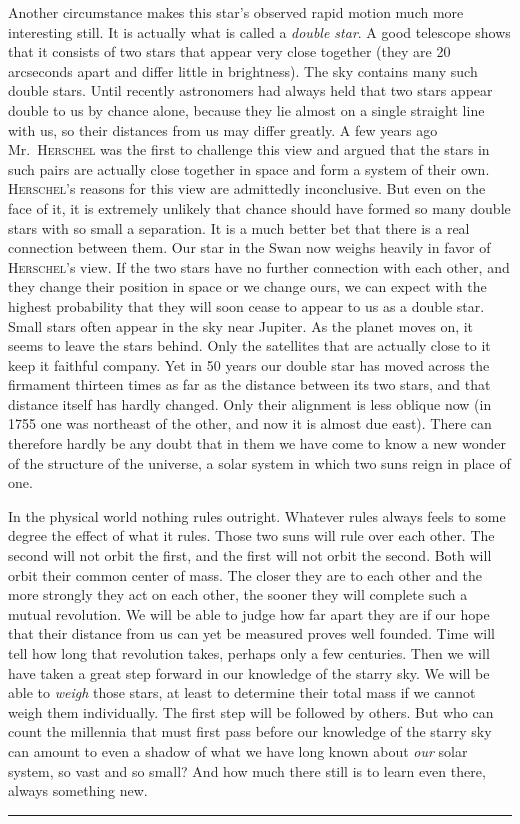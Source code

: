 Another circumstance makes this star’s observed rapid motion much more interesting still. It is actually what is called a \emph{double star}. A good telescope shows that it consists of two stars that appear very close together (they are 20 arcseconds apart and differ little in brightness). The sky contains many such double stars. Until recently astronomers had always held that two stars appear double to us by chance alone, because they lie almost on a single straight line with us, so their distances from us may differ greatly. A few years ago Mr.\ \textsc{Herschel} was the first to challenge this view and argued that the stars in such pairs are actually close together in space and form a system of their own. \textsc{Herschel}’s reasons for this view are admittedly inconclusive. But even on the face of it, it is extremely unlikely
%
that chance should have formed so many double stars with so small a separation. It is a much better bet that there is a real connection between them. Our star in the Swan now weighs heavily in favor of \textsc{Herschel}’s view. If the two stars have no further connection with each other, and they change their position in space or we change ours, we can expect with the highest probability that they will soon cease to appear to us as a double star. Small stars often appear in the sky near Jupiter. As the planet moves on, it seems to leave the stars behind. Only the satellites that are actually close to it keep it faithful company. Yet in 50 years our double star has moved across the firmament thirteen times as far as the distance between its two stars, and that distance itself has hardly changed. Only their alignment is less oblique now (in 1755 one was northeast of the other, and now it is almost due east). There can therefore hardly be any doubt that in them we have come to know a new wonder of the structure of the universe, a solar system in which two suns reign in place of one.

In the physical world nothing rules outright. Whatever rules always feels to some degree the effect of what it rules. Those two suns will rule over each other. The second will not orbit the first, and the first will not orbit the second. Both will orbit their common center of mass. The closer they are to each other and the more strongly they act on each other, the sooner they will complete such a mutual revolution. We will be able to judge how far apart they are if our hope that their distance from us can yet be measured proves well founded. Time will tell how long that revolution takes, perhaps only a few centuries. Then we will have taken a great step forward in our knowledge of the starry sky. We will be able to \emph{weigh} those stars, at least to determine their total mass if we cannot weigh them individually. The first step will be followed by others. But who can count the millennia that must first pass before our knowledge of the starry sky can amount to even a shadow of what we have long known about \emph{our} solar system, so vast and so small? And how much there still is to learn even there, always something new.
\begin{center}\rule{0.24\linewidth}{0.4pt}\end{center}
